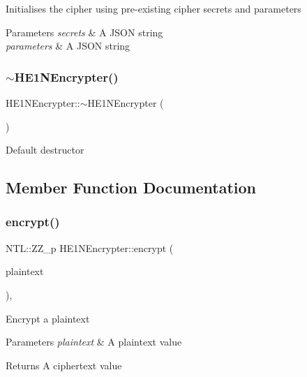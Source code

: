 Initialises the cipher using pre-\/existing cipher secrets and parameters 
\begin{DoxyParams}{Parameters}
{\em secrets} & A J\+S\+ON string \\
\hline
{\em parameters} & A J\+S\+ON string \\
\hline
\end{DoxyParams}
\mbox{\label{classHE1NEncrypter_a995b560b8ae6270eb325b52b0073e86b}} 
\subsubsection{\texorpdfstring{$\sim$\+H\+E1\+N\+Encrypter()}{~HE1NEncrypter()}}
{\footnotesize\ttfamily H\+E1\+N\+Encrypter\+::$\sim$\+H\+E1\+N\+Encrypter (\begin{DoxyParamCaption}{ }\end{DoxyParamCaption})\hspace{0.3cm}{\ttfamily [virtual]}}

Default destructor 

\subsection{Member Function Documentation}
\mbox{\label{classHE1NEncrypter_a9a9c76558466ac56093cb6da937c7fe3}} 
\subsubsection{\texorpdfstring{encrypt()}{encrypt()}}
{\footnotesize\ttfamily N\+T\+L\+::\+Z\+Z\+\_\+p H\+E1\+N\+Encrypter\+::encrypt (\begin{DoxyParamCaption}\item[{N\+T\+L\+::\+ZZ \&}]{plaintext }\end{DoxyParamCaption})\hspace{0.3cm}{\ttfamily [override]}, {\ttfamily [virtual]}}

Encrypt a plaintext 
\begin{DoxyParams}{Parameters}
{\em plaintext} & A plaintext value \\
\hline
\end{DoxyParams}
\begin{DoxyReturn}{Returns}
A ciphertext value 
\end{DoxyReturn}


